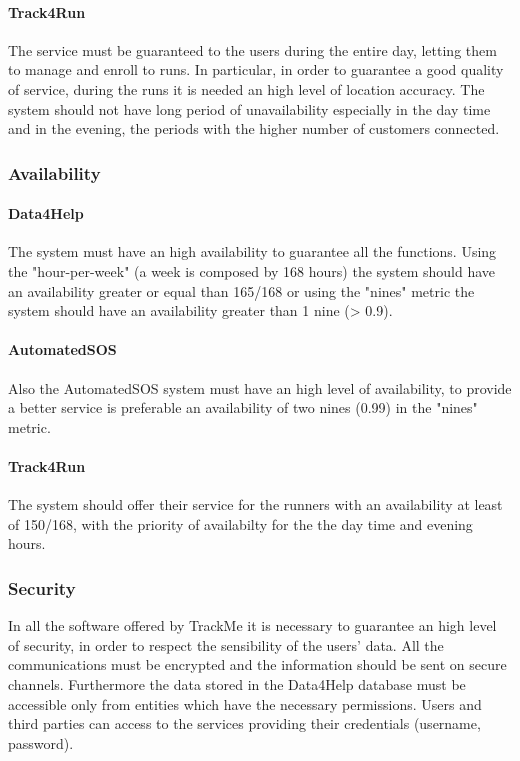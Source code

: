 \documentclass[a4paper]{article}
\begin{document}
    \paragraph{Track4Run} The service must be guaranteed to the users during the entire day, letting them to manage and enroll to runs. In particular, in order to guarantee a good quality of service, during the runs it is needed an high level of location accuracy. The system should not have long period of unavailability especially in the day time and in the evening, the periods with the higher number of customers connected.
    \subsubsection{Availability}
    
    \paragraph{Data4Help} The system must have an high availability to guarantee all the functions. Using the "hour-per-week"  (a week is composed by 168 hours) the system should have an availability greater or equal than 165/168 or using the "nines" metric the system should have an availability greater than 1 nine (> 0.9).
    
    \paragraph{AutomatedSOS} Also the AutomatedSOS system must have an high level of availability, to provide a better service is preferable an availability of two nines (0.99) in the "nines" metric.
    
    \paragraph{Track4Run} The system should offer their service for the runners with an availability at least of 150/168, with the priority of availabilty for the the day time and evening hours.
    
    \subsubsection{Security}
    
    In all the software offered by TrackMe it is necessary to guarantee an high level of security, in order to respect the sensibility of the users' data.
    All the communications must be encrypted and the information should be sent on secure channels.
    Furthermore the data stored in the Data4Help database must be accessible only from entities which have the necessary permissions. 
    Users and third parties can access to the services providing their credentials (username, password). 
    
\end{document}

